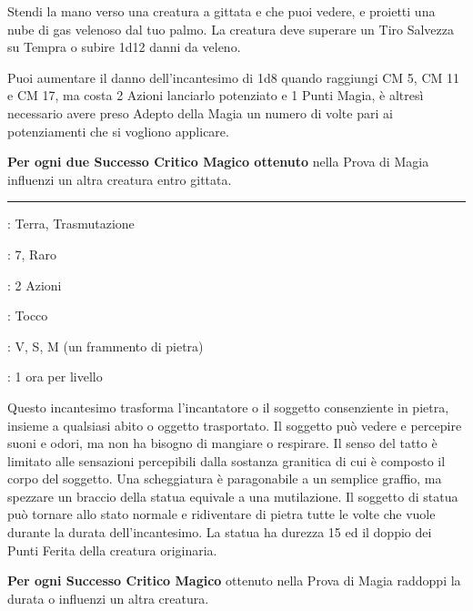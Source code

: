 \begin{multicols}{2}
Stendi la mano verso una creatura a gittata e che puoi vedere, e proietti una nube di gas velenoso dal tuo palmo. La creatura deve superare un Tiro Salvezza su Tempra o subire 1d12 danni da veleno.

Puoi aumentare il danno dell'incantesimo di 1d8 quando raggiungi CM 5, CM 11 e CM 17, ma costa 2 Azioni lanciarlo potenziato e 1 Punti Magia, è altresì necessario avere preso Adepto della Magia un numero di volte pari ai potenziamenti che si vogliono applicare.

\textbf{Per ogni due Successo Critico Magico ottenuto} nella Prova di Magia influenzi un altra creatura entro gittata.


\smallskip\noindent\rule{\linewidth}{2pt} \hypertarget{Statua}{}\smallskip{}
\noindent
\begin{description}[noitemsep, topsep=0pt, parsep=0pt, partopsep=0pt, leftmargin=0cm, labelwidth=2.8cm]
	\item[\textbf{Lista di Magia}]: Terra, Trasmutazione
	\item[\textbf{Livello}]: 7, Raro
	\item[\textbf{T. di Lancio}]: 2 Azioni
	\item[\textbf{Gittata}]: Tocco
	\item[\textbf{Componenti}]: V, S, M (un frammento di pietra)
	\item[\textbf{Durata}]: 1 ora per livello
\end{description}

Questo incantesimo trasforma l'incantatore o il soggetto consenziente in pietra, insieme a qualsiasi abito o oggetto trasportato. Il soggetto può vedere e percepire suoni e odori, ma non ha bisogno di mangiare o respirare. Il senso del tatto è limitato alle sensazioni percepibili dalla sostanza granitica di cui è composto il corpo del soggetto. Una scheggiatura è paragonabile a un semplice graffio, ma spezzare un braccio della statua equivale a una mutilazione. Il soggetto di statua può tornare allo stato normale e ridiventare di pietra tutte le volte che vuole durante la durata dell'incantesimo. La statua ha durezza 15 ed il doppio dei Punti Ferita della creatura originaria.

\textbf{Per ogni Successo Critico Magico} ottenuto nella Prova di Magia raddoppi la durata o influenzi un altra creatura.


\end{multicols}
